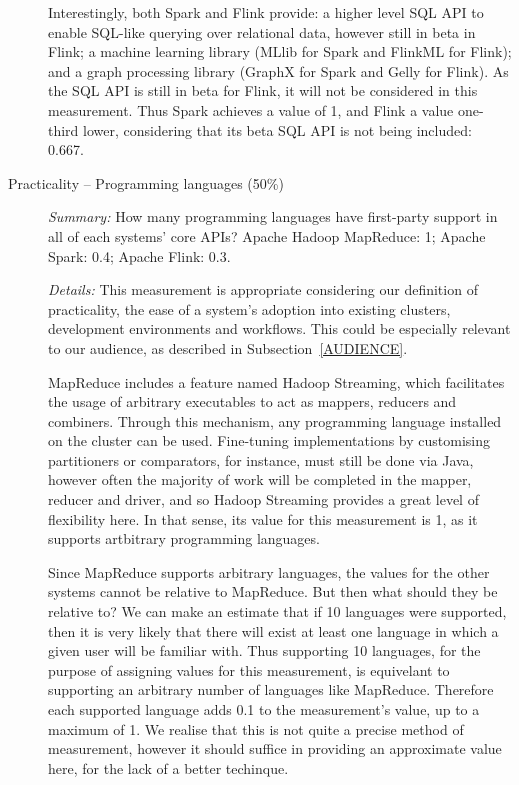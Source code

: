 \begin{description}
      Interestingly, both Spark and Flink provide: a higher level SQL API to enable SQL-like querying over relational data, however still in beta in Flink; a machine learning library (MLlib for Spark and FlinkML for Flink); and a graph processing library (GraphX for Spark and Gelly for Flink). As the SQL API is still in beta for Flink, it will not be considered in this measurement. Thus Spark achieves a value of 1, and Flink a value one-third lower, considering that its beta SQL API is not being included: 0.667.

    \item[Practicality -- Programming languages (50\%)]
      \textit{Summary:} How many programming languages have first-party support in all of each systems' core APIs? Apache Hadoop MapReduce: 1; Apache Spark: 0.4; Apache Flink: 0.3.\medskip

      \textit{Details:} This measurement is appropriate considering our definition of practicality, the ease of a system's adoption into existing clusters, development environments and workflows. This could be especially relevant to our audience, as described in Subsection~\ref{AUDIENCE}.

      MapReduce includes a feature named Hadoop Streaming, which facilitates the usage of arbitrary executables to act as mappers, reducers and combiners. Through this mechanism, any programming language installed on the cluster can be used. Fine-tuning implementations by customising partitioners or comparators, for instance, must still be done via Java, however often the majority of work will be completed in the mapper, reducer and driver, and so Hadoop Streaming provides a great level of flexibility here. In that sense, its value for this measurement is 1, as it supports artbitrary programming languages.

      Since MapReduce supports arbitrary languages, the values for the other systems cannot be relative to MapReduce. But then what should they be relative to? We can make an estimate that if 10 languages were supported, then it is very likely that there will exist at least one language in which a given user will be familiar with. Thus supporting 10 languages, for the purpose of assigning values for this measurement, is equivelant to supporting an arbitrary number of languages like MapReduce. Therefore each supported language adds 0.1 to the measurement's value, up to a maximum of 1. We realise that this is not quite a precise method of measurement, however it should suffice in providing an approximate value here, for the lack of a better techinque.


\end{description}
